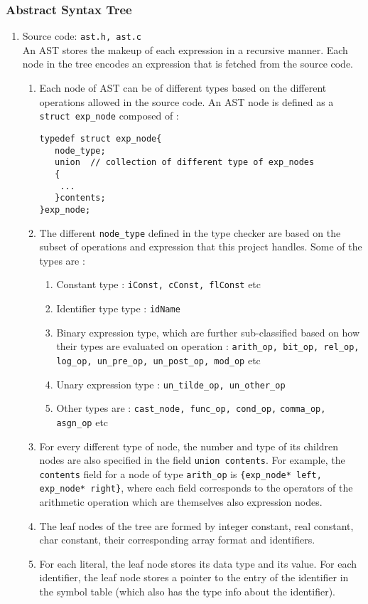 \documentclass[12pt]{article}
\begin{document}
\subsubsection{Abstract Syntax Tree} 
\label{AST}
\begin{enumerate}
\item Source code: \texttt{ast.h, ast.c}
\\ An AST stores the makeup of each expression in a recursive manner. Each node in the tree encodes an expression that is fetched from the source code.
\begin{enumerate}
\item Each node of AST can be of different types based on the different operations allowed in the source code. An AST node is defined as a \texttt{struct exp\_node} composed of :
\begin{verbatim}
typedef struct exp_node{   
   node_type; 
   union  // collection of different type of exp_nodes  
   { 
   	...
   }contents;
}exp_node;
\end{verbatim}

\item The different \texttt{node\_type} defined in the type checker are based on the subset of operations and expression that this project handles. Some of the types are :
\begin{enumerate}
\item Constant type :  \texttt{iConst, cConst, flConst} etc
\item Identifier type type :  \texttt{idName}
\item Binary expression type, which are further sub-classified based on how their types are evaluated on operation : \texttt{arith\_op, bit\_op, rel\_op, log\_op, un\_pre\_op, un\_post\_op, mod\_op} etc
\item Unary expression type : \texttt{un\_tilde\_op, un\_other\_op}
\item Other types are : \texttt{cast\_node, func\_op, cond\_op,} \texttt{comma\_op, asgn\_op} etc
\end{enumerate}
\item For every different type of node, the number and type of its children nodes are also specified in the field \texttt{union contents}. For example, the \texttt{contents} field for a node of type \texttt{arith\_op} is  
\texttt{\{exp\_node* left, exp\_node* right\}}, where each field corresponds to the operators of the arithmetic operation which are themselves also expression nodes.
\item The leaf nodes of the tree are formed by integer constant, real constant, char constant, their corresponding array format and identifiers. 
\item For each literal, the leaf node stores its data type and its value. For each identifier, the leaf node stores a pointer to the entry of the identifier in the symbol table (which also has the type info about the identifier).
\end{enumerate}
\end{enumerate}
\end{document}
